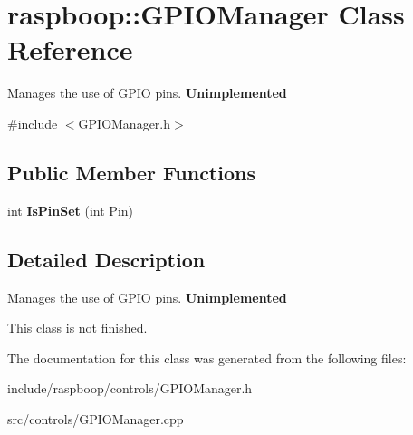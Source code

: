 \hypertarget{classraspboop_1_1GPIOManager}{\section{raspboop\-:\-:G\-P\-I\-O\-Manager Class Reference}
\label{classraspboop_1_1GPIOManager}
}


Manages the use of G\-P\-I\-O pins. {\bfseries Unimplemented}  




{\ttfamily \#include $<$G\-P\-I\-O\-Manager.\-h$>$}

\subsection*{Public Member Functions}
\begin{DoxyCompactItemize}
\item 
\hypertarget{classraspboop_1_1GPIOManager_a5ed2a83f4b2629e8eda38f1ed48679f4}{int {\bfseries Is\-Pin\-Set} (int Pin)}\label{classraspboop_1_1GPIOManager_a5ed2a83f4b2629e8eda38f1ed48679f4}

\end{DoxyCompactItemize}


\subsection{Detailed Description}
Manages the use of G\-P\-I\-O pins. {\bfseries Unimplemented} 

This class is not finished. 

The documentation for this class was generated from the following files\-:\begin{DoxyCompactItemize}
\item 
include/raspboop/controls/G\-P\-I\-O\-Manager.\-h\item 
src/controls/G\-P\-I\-O\-Manager.\-cpp\end{DoxyCompactItemize}
